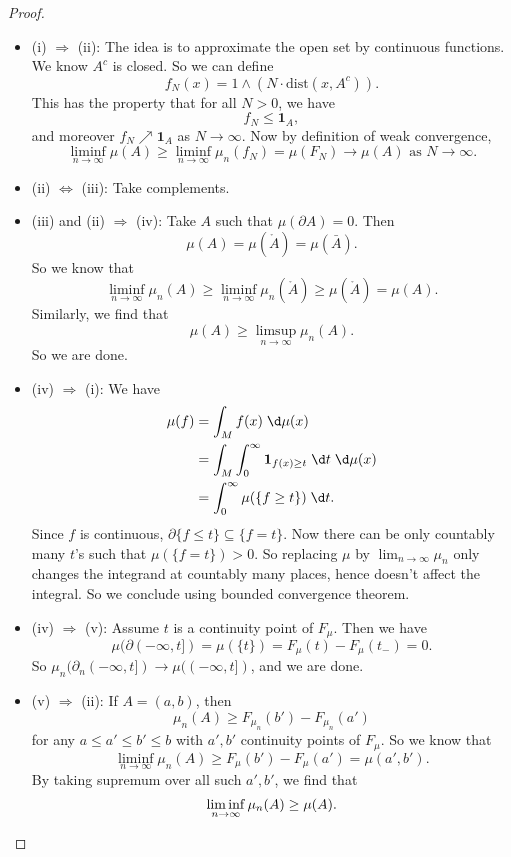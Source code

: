 \documentclass[a4paper]{article}
\begin{document}
\begin{proof}\leavevmode
  \begin{itemize}
    \item (i) $\Rightarrow$ (ii): The idea is to approximate the open set by continuous functions. We know $A^c$ is closed. So we can define
      \[
        f_N(x) = 1 \wedge (N \cdot \mathrm{dist}(x, A^c)).
      \]
      This has the property that for all $N > 0$, we have
      \[
        f_N \leq \mathbf{1}_A,
      \]
      and moreover $f_N \nearrow \mathbf{1}_A$ as $N \to \infty$. Now by definition of weak convergence,
      \[
        \liminf_{n \to \infty} \mu(A)\geq \liminf_{n \to \infty} \mu_n(f_N) = \mu(F_N) \to \mu(A)\text{ as }N \to \infty.
      \]
    \item (ii) $\Leftrightarrow$ (iii): Take complements.
    \item (iii) and (ii) $\Rightarrow$ (iv): Take $A$ such that $\mu(\partial A) = 0$. Then
      \[
        \mu(A) = \mu(\mathring{A}) = \mu(\bar{A}).
      \]
      So we know that
      \[
        \liminf_{n \to \infty} \mu_n(A) \geq \liminf_{n \to \infty} \mu_n(\mathring{A}) \geq \mu(\mathring{A}) = \mu(A).
      \]
      Similarly, we find that
      \[
        \mu(A) \geq \limsup_{n \to \infty} \mu_n(A).
      \]
      So we are done.
    \item (iv) $\Rightarrow$ (i): We have
      \begin{align*}
        \mu(f) &= \int_M f(x) \;\d \mu(x)\\
        &= \int_M \int_0^\infty \mathbf{1}_{f(x) \geq t}\;\d t \;\d \mu(x)\\
        &= \int_0^\infty \mu(\{f \geq t\})\;\d t.
      \end{align*}
      Since $f$ is continuous, $\partial \{f \leq t\} \subseteq \{f = t\}$. Now there can be only countably many $t$'s such that $\mu(\{f = t\}) > 0$. So replacing $\mu$ by $\lim_{n \to \infty}\mu_n$ only changes the integrand at countably many places, hence doesn't affect the integral. So we conclude using bounded convergence theorem.

    \item (iv) $\Rightarrow$ (v): Assume $t$ is a continuity point of $F_\mu$. Then we have
      \[
        \mu(\partial(-\infty, t]) = \mu(\{t\}) = F_\mu(t) - F_\mu(t_-) = 0.
      \]
      So $\mu_n(\partial_n(-\infty, t]) \to \mu((-\infty, t])$, and we are done.
    \item (v) $\Rightarrow$ (ii): If $A = (a, b)$, then
      \[
        \mu_n(A) \geq F_{\mu_n} (b') - F_{\mu_n}(a')
      \]
      for any $a \leq a' \leq b' \leq b$ with $a', b'$ continuity points of $F_\mu$. So we know that
      \[
        \liminf_{n \to \infty} \mu_n(A) \geq F_\mu(b') - F_\mu(a') = \mu(a', b').
      \]
      By taking supremum over all such $a', b'$, we find that
      \[
        \liminf_{n \to \infty} \mu_n(A) \geq \mu(A).\qedhere
      \]%
  \end{itemize}
\end{proof}
\end{document}
